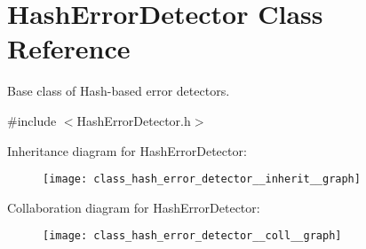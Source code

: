 \hypertarget{class_hash_error_detector}{}\section{Hash\+Error\+Detector Class Reference}
\label{class_hash_error_detector}


Base class of Hash-\/based error detectors.  




{\ttfamily \#include $<$Hash\+Error\+Detector.\+h$>$}



Inheritance diagram for Hash\+Error\+Detector\+:
\nopagebreak
\begin{figure}[H]
\begin{center}
\leavevmode
\texttt{[image: class\_hash\_error\_detector\_\_inherit\_\_graph]}
\end{center}
\end{figure}


Collaboration diagram for Hash\+Error\+Detector\+:
\nopagebreak
\begin{figure}[H]
\begin{center}
\leavevmode
\texttt{[image: class\_hash\_error\_detector\_\_coll\_\_graph]}
\end{center}
\end{figure}
